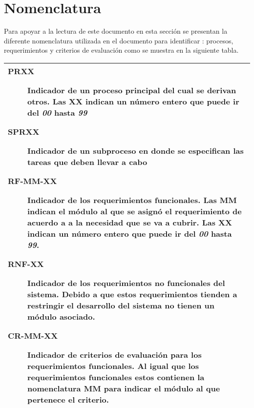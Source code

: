 \section{Nomenclatura}

Para apoyar a la lectura de este documento en esta sección se presentan la diferente nomenclatura utilizada en el documento para identificar : procesos, requerimientos y criterios de evaluación como se muestra en la siguiente tabla.


\begin{table}[hbtp!]
	\begin{center}
		\begin{tabular}{|p{}|}
			\hline
			\rowcolor{colorAgua}
			\begin{description}
				\item[PRXX] Indicador de un proceso principal del cual se derivan otros. Las XX indican un número entero que puede ir del \textit{00} hasta \textit{99} 
				\item[SPRXX] Indicador de un subproceso en donde se especifican las tareas que deben llevar a cabo 
				
				\item[RF-MM-XX] Indicador de los requerimientos funcionales. Las MM indican el módulo al que se asignó el requerimiento de acuerdo a a la necesidad que se va a cubrir. Las XX indican un número entero que puede ir del \textit{00} hasta \textit{99}.
				
				\item[RNF-XX] Indicador de los requerimientos no funcionales del sistema. Debido a que estos requerimientos tienden a restringir el desarrollo del sistema no tienen un módulo asociado.
				
				\item[CR-MM-XX] Indicador de criterios de evaluación para los requerimientos funcionales. Al igual que los requerimientos funcionales estos contienen la nomenclatura MM para indicar el módulo al que pertenece el criterio.
			\end{description}\\
			\hline
		\end{tabular}
	\end{center}
\end{table}



